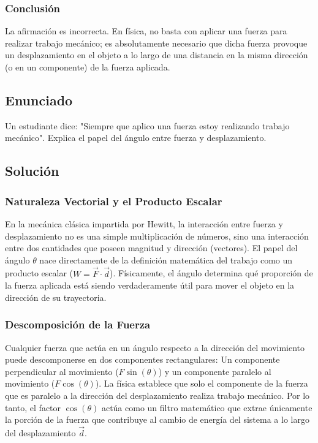 \documentclass[a4paper,12pt]{article}
\begin{document}
\subsubsection*{Conclusión}
La afirmación es incorrecta. En física, no basta con aplicar una fuerza para realizar trabajo mecánico; es absolutamente necesario que dicha fuerza provoque un desplazamiento en el objeto a lo largo de una distancia en la misma dirección (o en un componente) de la fuerza aplicada.


\newpage
\subsection*{Enunciado}
Un estudiante dice: "Siempre que aplico una fuerza estoy realizando trabajo mecánico". 
Explica el papel del ángulo entre fuerza y desplazamiento.

\subsection*{Solución}

\subsubsection*{Naturaleza Vectorial y el Producto Escalar}
En la mecánica clásica impartida por Hewitt, la interacción entre fuerza y desplazamiento no es una simple multiplicación de números, sino una interacción entre dos cantidades que poseen magnitud y dirección (vectores). El papel del ángulo $\theta$ nace directamente de la definición matemática del trabajo como un producto escalar ($W = \vec{F} \cdot \vec{d}$). Físicamente, el ángulo determina qué proporción de la fuerza aplicada está siendo verdaderamente útil para mover el objeto en la dirección de su trayectoria.

\subsubsection*{Descomposición de la Fuerza}
Cualquier fuerza que actúa en un ángulo respecto a la dirección del movimiento puede descomponerse en dos componentes rectangulares:
Un componente perpendicular al movimiento ($F \sin(\theta)$) y un componente paralelo al movimiento ($F \cos(\theta)$). 
La física establece que solo el componente de la fuerza que es paralelo a la dirección del desplazamiento realiza trabajo mecánico. Por lo tanto, el factor $\cos(\theta)$ actúa como un filtro matemático que extrae únicamente la porción de la fuerza que contribuye al cambio de energía del sistema a lo largo del desplazamiento $\vec{d}$.
\end{document}

